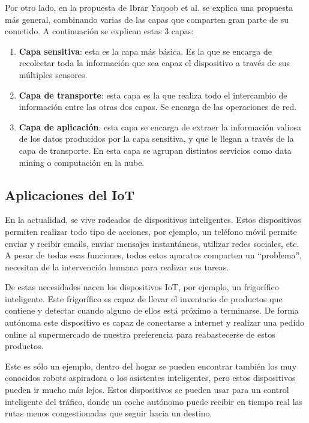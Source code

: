 Por otro lado, en la propuesta de Ibrar Yaqoob et al. \cite{yaqoob2017internet} se explica una propuesta más general, combinando varias de las capas que comparten gran parte de su cometido. A continuación se explican estas 3 capas:

\begin{enumerate}
    \item \textbf{Capa sensitiva}: esta es la capa más básica. Es la que se encarga de recolectar toda la información que sea capaz el dispositivo a través de sus múltiples sensores.
    \item \textbf{Capa de transporte}: esta capa es la que realiza todo el intercambio de información entre las otras dos capas. Se encarga de las operaciones de red.
    \item \textbf{Capa de aplicación}: esta capa se encarga de extraer la información valiosa de los datos producidos por la capa sensitiva, y que le llegan a través de la capa de transporte. En esta capa se agrupan distintos servicios como data mining o computación en la nube.
\end{enumerate}

\subsection{Aplicaciones del IoT}

En la actualidad, se vive rodeados de dispositivos inteligentes. Estos dispositivos  permiten realizar todo tipo de acciones, por ejemplo, un teléfono móvil permite enviar y recibir emails, enviar mensajes instantáneos, utilizar redes sociales, etc. A pesar de todas esas funciones, todos estos aparatos comparten un ``problema'', necesitan de la intervención humana para realizar sus tareas.

De estas necesidades nacen los dispositivos IoT, por ejemplo, un frigorífico inteligente. Este frigorífico es capaz de llevar el inventario de productos que contiene y detectar cuando alguno de ellos está próximo a terminarse. De forma autónoma este dispositivo es capaz de conectarse a internet y realizar una pedido online al supermercado de nuestra preferencia para reabastecerse de estos productos.

Este es sólo un ejemplo, dentro del hogar se pueden encontrar también los muy conocidos robots aspiradora o los asistentes inteligentes, pero estos dispositivos pueden ir mucho más lejos. Estos dispositivos se pueden usar para un control inteligente del tráfico, donde un coche autónomo puede recibir en tiempo real las rutas menos congestionadas que seguir hacia un destino.

